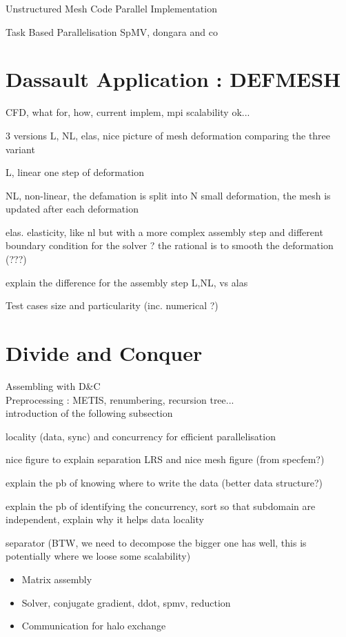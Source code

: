 \documentclass{IOS-Book-Article}
\begin{document}
 \item Unstructured Mesh Code Parallel Implementation
 \item Task Based Parallelisation SpMV, dongara and co \cite{MPI_task}

\section{Dassault Application : DEFMESH}

CFD, what for, how, current implem, mpi scalability ok...

3 versions L, NL, elas, nice picture of mesh deformation comparing the three variant

L, linear one step of deformation

NL, non-linear, the defamation is split into N small deformation, the mesh is updated after each deformation

elas. elasticity, like nl but with a more complex assembly step and different boundary condition for the solver ? the rational is to smooth the deformation (???)


explain the difference for the assembly step L,NL, vs alas

Test cases size and particularity (inc. numerical ?)



\section{Divide and Conquer}

Assembling with D&C \\
Preprocessing : METIS, renumbering, recursion tree...\\

introduction of the following subsection

locality (data, sync) and concurrency for efficient parallelisation

nice figure to explain separation LRS and nice mesh figure (from specfem?)


explain the pb of knowing where to write the data (better data structure?)

explain the pb of identifying the concurrency, sort so that subdomain are independent, explain why it helps data locality

separator (BTW, we need to decompose the bigger one has well, this is potentially where we loose some scalability)

\begin{itemize}
\item Matrix assembly
\item Solver, conjugate gradient, ddot, spmv, reduction
\item Communication for halo exchange
\end{itemize}
\end{document}
